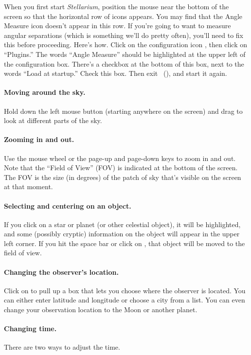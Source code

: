 When you first start \textit{Stellarium}, position the mouse
near the bottom of the screen so that the horizontal
row of icons appears. You may find that the
Angle Measure icon  doesn't appear in this row.
If you're going to want to measure angular separations (which is
something we'll do pretty often), you'll need to fix this before proceeding.
Here's how. Click on the configuration icon , then click on
``Plugins.'' The words ``Angle Measure'' should be highlighted at the 
upper left of the configuration box. There's a checkbox at the bottom
of this box, next to the words ``Load at startup.'' Check this box.
Then exit \stellarium\ (), and start it again.


\paragraph{Moving around the sky.} Hold down the left mouse button
(starting anywhere on the screen) and drag to look at different parts
of the sky.


\paragraph{Zooming in and out.} Use the mouse wheel or the page-up and 
page-down keys to
zoom in and out. Note that the ``Field of View'' (FOV) is indicated
at the bottom of the screen. The FOV is the size (in degrees) of the
patch of sky that's visible on the screen at that moment.

\paragraph{Selecting and centering on an object.}
If you click on a star or planet (or other celestial object), it will
be highlighted, and some (possibly cryptic) information on
the object will appear in the upper left corner. If you hit the
space bar or click on , that object will be moved to the
field of view.

\paragraph{Changing the observer's location.} Click on 
 to pull up a box that lets you
choose where the observer is located. You can either enter latitude
and longitude or choose a city from a list. You can even change your
observation location to the Moon or another planet.

\paragraph{Changing time.} There are two ways to adjust the 
time.

